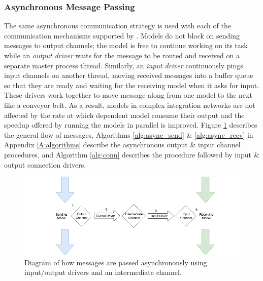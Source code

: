 \documentclass[journal]{IEEEtran}
\newcommand{\todo}[1]{{\color{red}{#1}}}
\newcommand{\pkg}{{\tt \todo{cis\_interface}}{}}
\newcommand{\A}{Appendix{ }}
\begin{document}
\subsubsection{Asynchronous Message Passing}\label{SSS:async}
%
The same asynchronous communication strategy is used with each of the communication mechanisms supported by {\pkg}. Models do not block on sending messages to output channels; the model is free to continue working on its task while an \emph{output driver} waits for the message to be routed and received on a separate master process thread. Similarly, an \emph{input driver} continuously pings input channels on another thread, moving received messages into a buffer queue so that they are ready and waiting for the receiving model when it asks for input. These drivers work together to move message along from one model to the next like a conveyor belt. As a result, models in complex integration networks are not affected by the rate at which dependent model consume their output and the speedup offered by running the models in parallel is improved. Figure \ref{fig:async} describes the general flow of messages, Algorithms \ref{alg:async_send} \& \ref{alg:async_recv} in \A\ref{A:algorithms} describe the asynchronous output \& input channel procedures, and Algorithm \ref{alg:conn} describes the procedure followed by input \& output connection drivers.
%
\ifinclfig
 	\begin{figure}[htbp]
	\begin{center}
	\includegraphics[width=\columnwidth,keepaspectratio]{./images/io_drivers.png}
	\caption{Diagram of how messages are passed asynchronously using input/output drivers and an intermediate channel.}
	\label{fig:async}
	\end{center}
	\end{figure}
\fi
%
\end{document}
